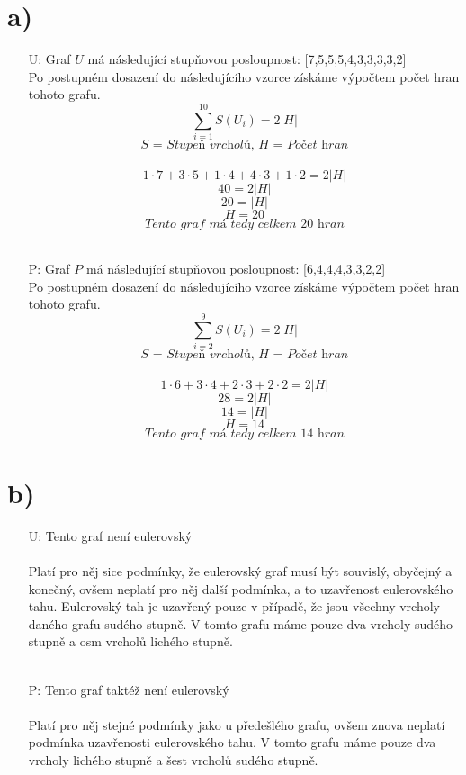 \documentclass[a4paper, 10pt, oneside]{article}       %
\begin{document}
\section*{a)}
\begin{enumerate}
    \item [U:]  Graf $U$ má následující stupňovou posloupnost: [7,5,5,5,4,3,3,3,3,2] \\ 
                Po postupném dosazení do následujícího vzorce získáme výpočtem počet hran tohoto grafu.\\
                \[ \sum_{i=1}^{10} S(U_i) = 2 |H| \]
                $$ \textit{S = Stupeň vrcholů, H = Počet hran} $$ \\
                $$ 1\cdot7 + 3\cdot5 + 1\cdot4 + 4\cdot3 + 1\cdot2  = 2 |H| $$
                $$ 40 = 2 |H| $$
                $$ 20 = |H| $$
                $$ H = 20 $$
                $$ \textit{Tento graf má tedy celkem 20 hran} $$
    \\
    \item [P:]  Graf $P$ má následující stupňovou posloupnost: [6,4,4,4,3,3,2,2] \\ 
                Po postupném dosazení do následujícího vzorce získáme výpočtem počet hran tohoto grafu.\\
                \[ \sum_{i=2}^{9} S(U_i) = 2 |H| \]
                $$ \textit{S = Stupeň vrcholů, H = Počet hran} $$ \\
                $$ 1\cdot6 + 3\cdot4 + 2\cdot3 + 2\cdot2 =  2 |H| $$
                $$ 28 = 2 |H| $$
                $$ 14 = |H| $$
                $$ H = 14 $$
                $$ \textit{Tento graf má tedy celkem 14 hran} $$
\end{enumerate}

\section*{b)}
\begin{enumerate}
    \item [U:]  Tento graf není eulerovský\\\\
                Platí pro něj sice podmínky, že eulerovský graf musí být souvislý, obyčejný a konečný, ovšem neplatí pro něj další podmínka, a to uzavřenost eulerovského tahu. Eulerovský tah je uzavřený pouze v případě, že jsou všechny vrcholy daného grafu sudého stupně. V tomto grafu máme pouze dva vrcholy sudého stupně a osm vrcholů lichého stupně.\\
    \\
    \item [P:]  Tento graf taktéž není eulerovský\\\\
                Platí pro něj stejné podmínky jako u předešlého grafu,  ovšem znova neplatí podmínka uzavřenosti eulerovského tahu. V tomto grafu máme pouze dva vrcholy lichého stupně a šest vrcholů sudého stupně.\\
\end{enumerate}
\end{document}
